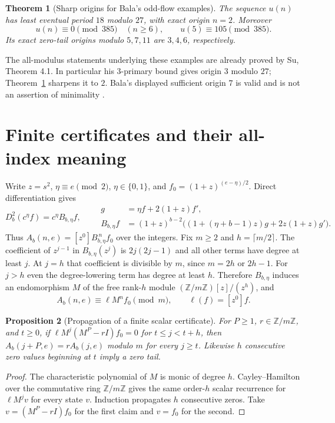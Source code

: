 \documentclass[11pt]{article}
\newtheorem{theorem}{Theorem}
\newtheorem{proposition}[theorem]{Proposition}
\newcommand{\Z}{\mathbb Z}
\begin{document}
\begin{theorem}[Sharp origins for Bala's odd-flow examples]\label{thm:sharp}
The sequence $u(n)$ has least eventual period $18$ modulo $27$,
with exact origin $n=2$. Moreover
\[
 u(n)\equiv0\pmod{385}\quad(n\geq6),\qquad u(5)\equiv105\pmod{385}.
\]
Its exact zero-tail origins modulo $5,7,11$ are $3,4,6$, respectively.
\end{theorem}
The all-modulus statements underlying these examples are already proved
by Su, Theorem 4.1. In particular his $3$-primary bound gives origin $3$
modulo $27$; Theorem~\ref{thm:sharp} sharpens it to $2$.
Bala's displayed sufficient origin $7$ is valid and is not an assertion
of minimality \cite[March 3, 2026 example block]{oeis428}.

\section{Finite certificates and their all-index meaning}
Write $z=s^2$, $\eta\equiv e\pmod2$, $\eta\in\{0,1\}$, and
$f_0=(1+z)^{(e-\eta)/2}$. Direct differentiation gives
\begin{equation}\label{eq:operator}
 D_b^2(c^\eta f)=c^\eta B_{b,\eta}f,\qquad
 \begin{aligned}
 g&=\eta f+2(1+z)f',\\
 B_{b,\eta}f&=(1+z)^{b-2}
       \bigl((1+(\eta+b-1)z)g+2z(1+z)g'\bigr).
 \end{aligned}
\end{equation}
Thus $A_b(n,e)=[z^0]B_{b,\eta}^{\,n}f_0$ over the integers.
Fix $m\geq2$ and $h=\lceil m/2\rceil$. The coefficient of $z^{j-1}$
in $B_{b,\eta}(z^j)$ is $2j(2j-1)$ and all other terms have degree
at least $j$. At $j=h$ that coefficient is divisible by $m$, since
$m=2h$ or $2h-1$. For $j>h$ even the degree-lowering term has degree
at least $h$. Therefore $B_{b,\eta}$ induces an endomorphism $M$ of the
free rank-$h$ module $(\Z/m\Z)[z]/(z^h)$, and
\begin{equation}\label{eq:scalar}
 A_b(n,e)\equiv\ell M^nf_0\pmod m,\qquad \ell(f)=[z^0]f.
\end{equation}

\begin{proposition}[Propagation of a finite scalar certificate]\label{prop:ch}
For $P\geq1$, $r\in\Z/m\Z$, and $t\geq0$, if
$\ell M^j(M^P-rI)f_0=0$ for $t\leq j<t+h$, then
$A_b(j+P,e)=rA_b(j,e)$ modulo $m$ for every $j\geq t$.
Likewise $h$ consecutive zero values beginning at $t$ imply a zero tail.
\end{proposition}
\begin{proof}
The characteristic polynomial of $M$ is monic of degree $h$.
Cayley--Hamilton over the commutative ring $\Z/m\Z$ gives the same
order-$h$ scalar recurrence for $\ell M^jv$ for every state $v$.
Induction propagates $h$ consecutive zeros. Take
$v=(M^P-rI)f_0$ for the first claim and $v=f_0$ for the second.
\end{proof}
\end{document}
